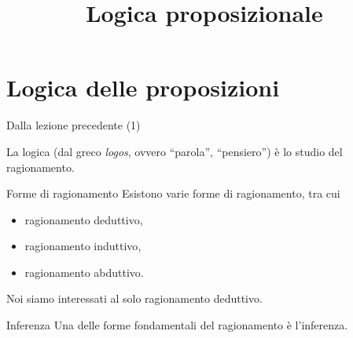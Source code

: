 \documentclass[aspectratio=169,10pt,dvipsnames,handout]{beamer}
\title{Logica proposizionale}
\begin{document}
\begin{frame}
    \titlepage
\end{frame}

\begin{frame}
    \copyrightpage
\end{frame}

\begin{frame}
\end{frame}

\section{Logica delle proposizioni}

\begin{frame}{Dalla lezione precedente (1)}
    \begin{definition}[Logica]
        La \alert{logica} (dal greco \textit{logos}, ovvero ``parola'', ``pensiero'') è lo studio del ragionamento.
    \end{definition}
    \pause
    \begin{block}{Forme di ragionamento}
        Esistono varie forme di ragionamento, tra cui
        \begin{itemize}
            \item \alert{ragionamento deduttivo},
            \item \alert{ragionamento induttivo},
            \item \alert{ragionamento abduttivo}.
        \end{itemize}
        Noi siamo interessati al solo ragionamento deduttivo.
    \end{block}

    \pause
    \medskip
    \begin{block}{Inferenza}
        Una delle forme fondamentali del ragionamento è l'inferenza.
    \end{block}
\end{frame}
\end{document}
